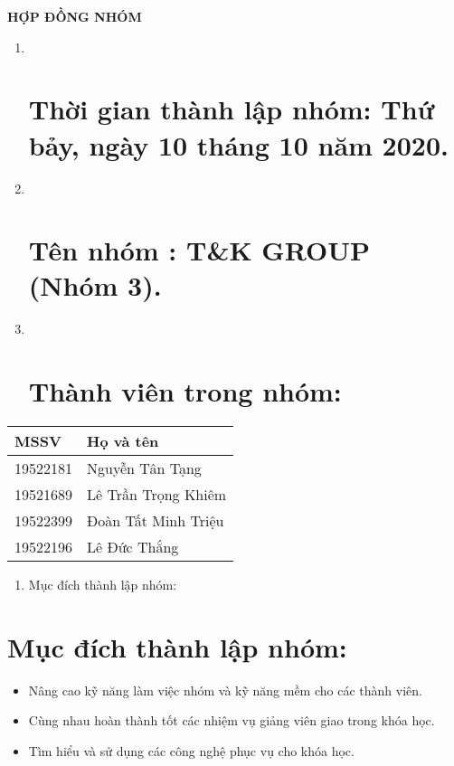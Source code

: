 \documentclass[]{article}
\date{}
\begin{document}
\textbf{HỢP ĐỒNG NHÓM}

\begin{enumerate}
\def\labelenumi{\Roman{enumi}.}
\item ~
  \section{\texorpdfstring{\textbf{Thời gian thành lập nhóm: Thứ bảy,
  ngày 10 tháng 10 năm
  2020.}}{Thời gian thành lập nhóm: Thứ bảy, ngày 10 tháng 10 năm 2020.}}\label{thux1eddi-gian-thuxe0nh-lux1eadp-nhuxf3m-thux1ee9-bux1ea3y-nguxe0y-10-thuxe1ng-10-nux103m-2020.}
\item ~
  \section{\texorpdfstring{\textbf{Tên nhóm : T\&K GROUP (Nhóm
  3).}}{Tên nhóm : T\&K GROUP (Nhóm 3).}}\label{tuxean-nhuxf3m-tk-group-nhuxf3m-3.}
\item ~
  \section{\texorpdfstring{\textbf{Thành viên trong
  nhóm:}}{Thành viên trong nhóm:}}\label{thuxe0nh-viuxean-trong-nhuxf3m}
\end{enumerate}

\begin{longtable}[]{@{}ll@{}}
\toprule
\textbf{MSSV} & \textbf{Họ và tên}\tabularnewline
\midrule
\endhead
19522181 & Nguyễn Tân Tạng\tabularnewline
19521689 & Lê Trần Trọng Khiêm\tabularnewline
19522399 & Đoàn Tất Minh Triệu\tabularnewline
19522196 & Lê Đức Thắng\tabularnewline
\bottomrule
\end{longtable}

\begin{enumerate}
\def\labelenumi{\Roman{enumi}.}
\item
  Mục đích thành lập nhóm:
\end{enumerate}

\section{\texorpdfstring{\textbf{Mục đích thành lập
nhóm:}}{Mục đích thành lập nhóm:}}\label{mux1ee5c-ux111uxedch-thuxe0nh-lux1eadp-nhuxf3m}

\begin{itemize}
\item
  Nâng cao kỹ năng làm việc nhóm và kỹ năng mềm cho các thành viên.
\item
  Cùng nhau hoàn thành tốt các nhiệm vụ giảng viên giao trong khóa học.
\item
  Tìm hiểu và sử dụng các công nghệ phục vụ cho khóa học.
\end{itemize}
\end{document}
